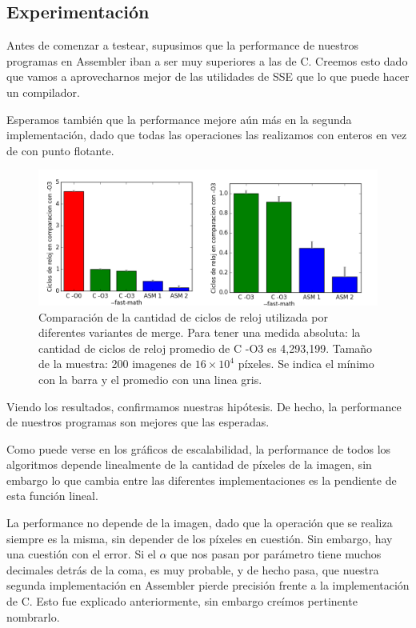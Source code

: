 \subsection{Experimentación}

Antes de comenzar a testear, supusimos que la performance de nuestros programas en Assembler iban a ser muy superiores a las de C. Creemos esto dado que vamos a aprovecharnos mejor de las utilidades de SSE que lo que puede hacer un compilador. 

Esperamos también que la performance mejore aún más en la segunda implementación, dado que todas las operaciones las realizamos con enteros en vez de con punto flotante.


\begin{figure}[!hbt] 
  \centering
  \includegraphics[scale=0.7]{merge-all.png}
  \caption{Comparación de la cantidad de ciclos de reloj utilizada por diferentes variantes de merge. Para tener una medida absoluta: la cantidad de ciclos de reloj promedio de C -O3 es 4,293,199. Tamaño de la muestra: 200 imagenes de $16 \times 10^4$ píxeles. Se indica el mínimo con la barra y el promedio con una linea gris.}
\end{figure}


Viendo los resultados, confirmamos nuestras hipótesis. De hecho, la performance de nuestros programas son mejores que las esperadas.

Como puede verse en los gráficos de escalabilidad, la performance de todos los algoritmos depende linealmente de la cantidad de píxeles de la imagen, sin embargo lo que cambia entre las diferentes implementaciones es la pendiente de esta función lineal.

La performance no depende de la imagen, dado que la operación que se realiza siempre es la misma, sin depender de los píxeles en cuestión.
Sin embargo, hay una cuestión con el error. Si el $\alpha$ que nos pasan por parámetro tiene muchos decimales detrás de la coma, es muy probable, y de hecho pasa, que nuestra segunda implementación en Assembler pierde precisión frente a la implementación de C. Esto fue explicado anteriormente, sin embargo creímos pertinente nombrarlo.


